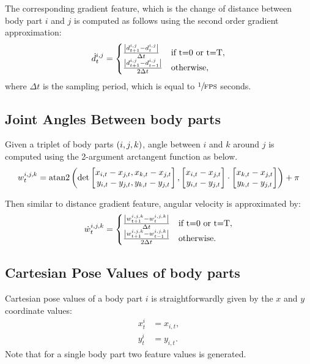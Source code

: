 The corresponding gradient feature, which is the change of distance between body part $i$ and $j$ is computed as follows using the second order gradient approximation:
\begin{equation}
	\dot{d}^{i,j}_t = \begin{cases} \frac{\abs{d^{i,j}_{t+1} - d^{i,j}_{t}}}{\Delta t} & \textnormal{if } $t=0$ \textnormal{ or } $t=T$, \\ \frac{\abs{d^{i,j}_{t+1} - d^{i,j}_{t-1}}}{2\Delta t} & \textnormal{otherwise}, \end{cases}
\end{equation}
where $\Delta t$ is the sampling period, which is equal to $\sfrac{1}{\textnormal{FPS}}$ seconds.

\subsection{Joint Angles Between body parts}
Given a triplet of body parts $\left(i,j,k\right)$, angle between $i$ and $k$ around $j$ is computed using the 2-argument arctangent function as below.
\begin{equation}
	w^{i,j,k}_t = \mathop{\rm{atan2}}\left(\det \begin{bmatrix} x_{i,t} - x_{j,t}, x_{k,t} - x_{j,t} \\ y_{i,t} - y_{j,t}, y_{k,t} - y_{j,t} \end{bmatrix}, \begin{bmatrix} x_{i,t} - x_{j,t} \\ y_{i,t} - y_{j,t} \end{bmatrix} \cdot \begin{bmatrix} x_{k,t} - x_{j,t}  \\ y_{k,t} - y_{j,t} \end{bmatrix}      \right) + \pi
\end{equation}

Then similar to distance gradient feature, angular velocity is approximated by:
\begin{equation}
	\dot{w}^{i,j,k}_t = \begin{cases} \frac{\abs{w^{i,j,k}_{t+1} - w^{i,j,k}_{t}}}{\Delta t} & \textnormal{if } $t=0$ \textnormal{ or } $t=T$, \\ \frac{\abs{w^{i,j,k}_{t+1} - w^{i,j,k}_{t-1}}}{2\Delta t} & \textnormal{otherwise}. \end{cases}
\end{equation}

\subsection{Cartesian Pose Values of body parts}
Cartesian pose values of a body part $i$ is straightforwardly given by the $x$ and $y$ coordinate values:
\begin{align}
	x^{i}_t & = x_{i,t}, \\
	y^{i}_t & = y_{i,t}.
\end{align}
Note that for a single body part two feature values is generated.

